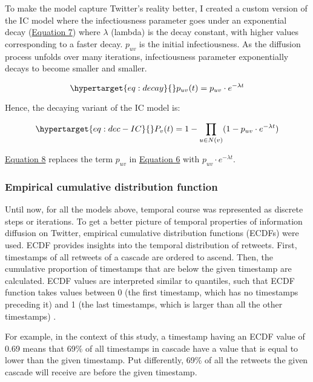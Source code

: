 \documentclass[11pt,a4paper]{article}
\begin{document}
        To make the model capture Twitter's reality better, I created a custom version of the IC model where the infectiousness parameter goes under an exponential decay (\hyperlink{eq:decay}{Equation 7}) where $\lambda$ (lambda) is the decay constant, with higher values corresponding to a faster decay. $p_{uv}$ is the initial infectiousness. As the diffusion process unfolds over many iterations, infectiousness parameter exponentially decays to become smaller and smaller.

        \begin{equation}
            \hypertarget{eq:decay}{}
            p_{uv}(t) = p_{uv} \cdot e^{-\lambda t}
        \end{equation}

        Hence, the decaying variant of the IC model is:

        \begin{equation}
            \hypertarget{eq:dec-IC}{}
            P_v(t) = 1 - \prod_{u \in N(v)} (1 - p_{uv} \cdot e^{-\lambda t})
        \end{equation}

        \hyperlink{eq:dec-IC}{Equation 8} replaces the term $p_{uv}$ in \hyperlink{eq:IC}{Equation 6} with $p_{uv} \cdot e^{-\lambda t}$.

        \subsubsection{Empirical cumulative distribution function}
        Until now, for all the models above, temporal course was represented as discrete steps or iterations. To get a better picture of temporal properties of information diffusion on Twitter, empirical cumulative distribution functions (ECDFs) were used. ECDF provides insights into the temporal distribution of retweets. First, timestamps of all retweets of a cascade are ordered to ascend. Then, the cumulative proportion of timestamps that are below the given timestamp are calculated. ECDF values are interpreted similar to quantiles, such that ECDF function takes values between 0 (the first timestamp, which has no timestamps preceding it) and 1 (the last timestamps, which is larger than all the other timestamps) \cite{conover_practical_1999}. 
        
        For example, in the context of this study, a timestamp having an ECDF value of 0.69 means that 69\% of all timestamps in cascade have a value that is equal to lower than the given timestamp. Put differently, 69\% of all the retweets the given cascade will receive are before the given timestamp. 
        
\end{document}
